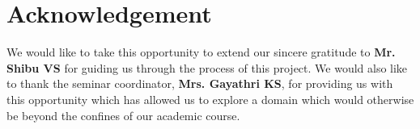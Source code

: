 \chapter*{\centering Acknowledgement}

\begin{flushleft}
	 We would like to take this opportunity to extend our sincere gratitude to \textbf{Mr. Shibu VS} for guiding us through the process of this project.
	 We would also like to thank the seminar coordinator, \textbf{Mrs. Gayathri KS}, for providing us with this opportunity which has allowed us to explore a domain which would otherwise be beyond the confines of our academic course.
\end{flushleft}
















